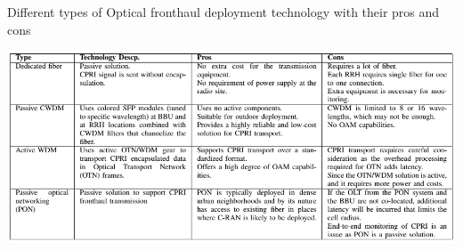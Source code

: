 \begin{table}[H]
\centering
\caption{Different types of Optical fronthaul deployment technology with their pros and cons \cite{art3-key43}}\label{tab01}
\includegraphics[scale=2.2]{src/Figures/chap3/tab01.jpg}
\end{table}

